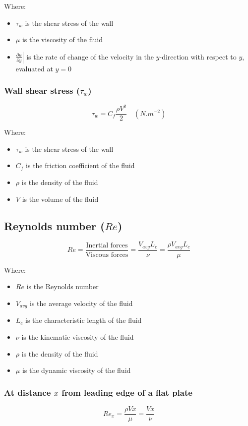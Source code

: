 \documentclass[11pt]{article}
\begin{document}
Where:
\begin{itemize}
\item \(\tau_w\) is the shear stress of the wall
\item \(\mu\) is the viscosity of the fluid
\item \(\left. \frac{\partial u}{\partial y} \right|\) is the rate of change of the velocity in the \(y\)-direction with respect to \(y\), evaluated at \(y = 0\)
\end{itemize}

\subsubsection{Wall shear stress (\(\tau_{w}\))}
\label{sec:org4d28101}
\[\tau_{w} = C_f \frac{\rho V^2}{2} \quad (\unit{N.m^{-2}})\]

Where:
\begin{itemize}
\item \(\tau_w\) is the shear stress of the wall
\item \(C_f\) is the friction coefficient of the fluid
\item \(\rho\) is the density of the fluid
\item \(V\) is the volume of the fluid
\end{itemize}

\subsection{Reynolds number (\(Re\))}
\label{sec:org6408713}
\[Re = \frac{\text{Inertial forces}}{\text{Viscous forces}} = \frac{V_{avg} L_c}{\nu} = \frac{\rho V_{avg} L_c}{\mu}\]

Where:
\begin{itemize}
\item \(Re\) is the Reynolds number
\item \(V_{avg}\) is the average velocity of the fluid
\item \(L_c\) is the characteristic length of the fluid
\item \(\nu\) is the kinematic viscosity of the fluid
\item \(\rho\) is the density of the fluid
\item \(\mu\) is the dynamic viscosity of the fluid
\end{itemize}

 \newpage

\subsubsection{At distance \(x\) from leading edge of a flat plate}
\label{sec:org97b441d}
\[Re_x = \frac{\rho V x}{\mu} = \frac{Vx}{\nu}\]
\end{document}
